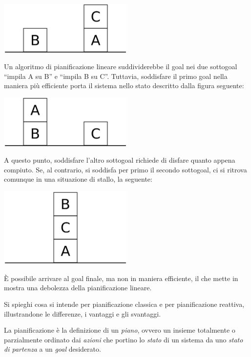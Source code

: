 \documentclass[answers, a4paper, 11pt]{exam}
\begin{document}
\begin{questions}
\begin{solution}
{    \centering

  \includegraphics[width=0.5\textwidth]{1280px-Sussman-anomaly-1.svg.png}

}

  Un algoritmo di pianificazione lineare suddividerebbe il goal nei due sottogoal ``impila A su B'' e ``impila B su C''. 
  Tuttavia, soddisfare il primo goal nella maniera più efficiente porta il sistema nello stato descritto dalla figura seguente:

  {

    \centering

  \includegraphics[width=0.5\textwidth]{2880px-Sussman-anomaly-2.svg.png}

}

  A questo punto, soddisfare l'altro sottogoal richiede di disfare quanto appena compiuto. 
  Se, al contrario, si soddisfa per primo il secondo sottogoal, ci si ritrova comunque in una situazione di stallo, la seguente:

    {

    \centering

  \includegraphics[width=0.5\textwidth]{2560px-Sussman-anomaly-3.svg.png}

}

È possibile arrivare al goal finale, ma non in maniera efficiente, il che mette in mostra una debolezza della pianificazione lineare. 

\end{solution}

\question Si spieghi cosa si intende per pianificazione classica e per pianificazione reattiva, illustrandone le
differenze, i vantaggi e gli svantaggi.
\begin{solution}
  La pianificazione è la definizione di un \emph{piano}, ovvero un insieme totalmente o parzialmente ordinato dai \emph{azioni} che portino lo \emph{stato} di un sistema da uno \emph{stato di partenza} a un \emph{goal} desiderato.


\end{solution}
\end{questions}
\end{document}
